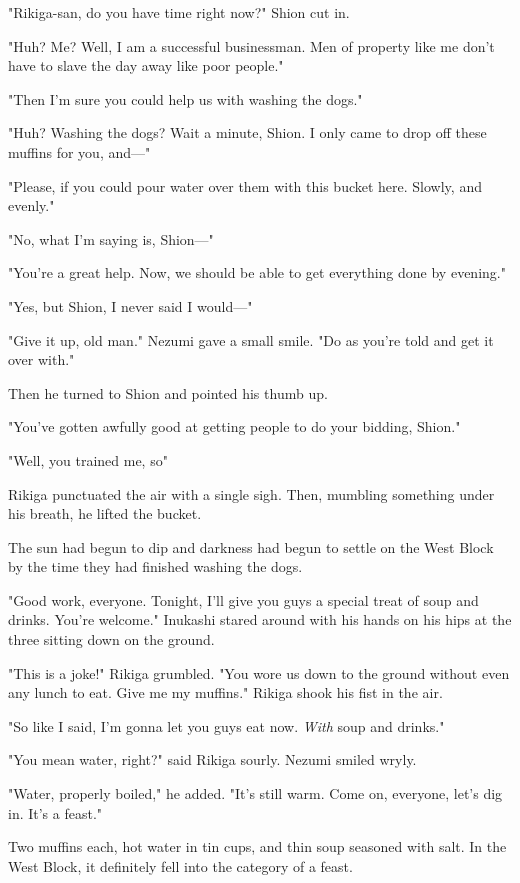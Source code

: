 "Rikiga-san, do you have time right now?" Shion cut in.

"Huh? Me? Well, I am a successful businessman. Men of property like me
don't have to slave the day away like poor people."

"Then I'm sure you could help us with washing the dogs."

"Huh? Washing the dogs? Wait a minute, Shion. I only came to drop off
these muffins for you, and---"

"Please, if you could pour water over them with this bucket here.
Slowly, and evenly."

"No, what I'm saying is, Shion---"

"You're a great help. Now, we should be able to get everything done by
evening."

"Yes, but Shion, I never said I would---"

"Give it up, old man." Nezumi gave a small smile. "Do as you're told and
get it over with."

Then he turned to Shion and pointed his thumb up.

"You've gotten awfully good at getting people to do your bidding,
Shion."

"Well, you trained me, so\el "

Rikiga punctuated the air with a single sigh. Then, mumbling something
under his breath, he lifted the bucket.

\myspace

The sun had begun to dip and darkness had begun to settle on the West
Block by the time they had finished washing the dogs.

"Good work, everyone. Tonight, I'll give you guys a special treat of
soup and drinks. You're welcome." Inukashi stared around with his hands
on his hips at the three sitting down on the ground.

"This is a joke!" Rikiga grumbled. "You wore us down to the ground
without even any lunch to eat. Give me my muffins." Rikiga shook his
fist in the air.

"So like I said, I'm gonna let you guys eat now. \emph{With} soup and drinks."

"You mean water, right?" said Rikiga sourly. Nezumi smiled wryly.

"Water, properly boiled," he added. "It's still warm. Come on, everyone,
let's dig in. It's a feast."

Two muffins each, hot water in tin cups, and thin soup seasoned with
salt. In the West Block, it definitely fell into the category of a
feast.


